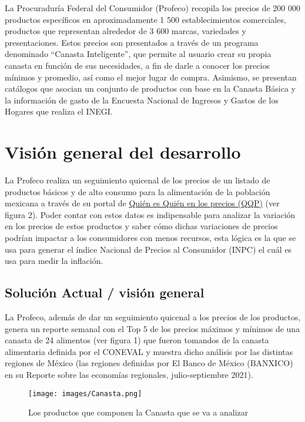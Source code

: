 \documentclass{article}
\begin{document}
\newpage
La Procuraduría Federal del Consumidor (Profeco) recopila los precios de 200 000 productos específicos en aproximadamente 1 500 establecimientos comerciales, productos que representan alrededor de 3 600 marcas, variedades y presentaciones. Estos precios son presentados a través de un programa denominado “Canasta Inteligente”, que permite al usuario crear su propia canasta en función de sus necesidades, a fin de darle a conocer los precios mínimos y promedio, así como el mejor lugar de compra. Asimismo, se presentan catálogos que asocian un conjunto de productos con base en la Canasta Básica y la información de gasto de la Encuesta Nacional de Ingresos y Gastos de los Hogares que realiza el INEGI. 

\section{Visión general del desarrollo}

La Profeco realiza un seguimiento quicenal de los precios de un listado de productos básicos y de alto consumo para la alimentación de la población mexicana a través de su portal de \href{https://www.profeco.gob.mx/precios/canasta/qqpc.php}{Quién es Quién en los precios (QQP)} (ver figura 2). Poder contar con estos datos es indipensable para analizar la variación en los precios de estos productos y saber cómo dichas variaciones de precios podrían impactar a los consumidores con menos recursos, esta lógica es la que se usa para generar el índice Nacional de Precios al Consumidor (INPC) el cuál es usa para medir la inflación.

\subsection{Solución Actual / visión general}
La Profeco, además de dar un seguimiento quicenal a los precios de los productos, genera un reporte semanal con el Top 5 de los precios máximos y mínimos de una canasta de 24 alimentos (ver figura 1) que fueron tomandos de la canasta alimentaria definida por el CONEVAL y muestra dicho análisis por las distintas regiones de México (las regiones definidas por El Banco de México (BANXICO) en su Reporte sobre las economías regionales, julio-septiembre 2021). 

\begin{figure}[h]
\centering
\texttt{[image: images/Canasta.png]}
\caption{\label{fig:Canasta}Los productos que componen la Canasta que se va a analizar}
\end{figure}
\end{document}
